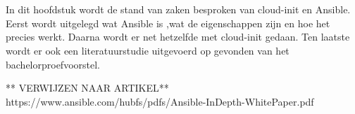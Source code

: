\chapter{}
\label{ch:stand-van-zaken}






In dit hoofdstuk wordt de stand van zaken besproken van cloud-init en Ansible. Eerst wordt uitgelegd wat Ansible is ,wat de eigenschappen zijn en hoe het precies werkt. Daarna wordt er net hetzelfde met cloud-init gedaan. Ten laatste wordt er ook een literatuurstudie uitgevoerd op gevonden van het bachelorproefvoorstel.

** VERWIJZEN NAAR ARTIKEL**
https://www.ansible.com/hubfs/pdfs/Ansible-InDepth-WhitePaper.pdf

